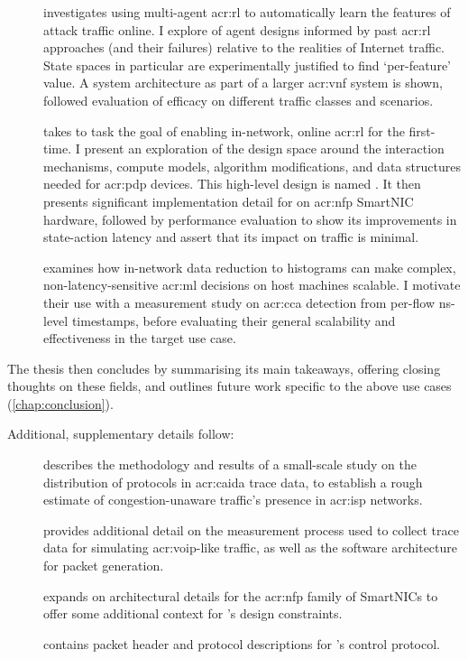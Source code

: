 \begin{description}
	\item[] investigates using multi-agent \gls{acr:rl} to automatically learn the features of attack traffic online. I explore of agent designs informed by past \gls{acr:rl} approaches (and their failures) relative to the realities of Internet traffic. State spaces in particular are experimentally justified to find `per-feature' value. A system architecture as part of a larger \gls{acr:vnf} system is shown, followed evaluation of efficacy on different traffic classes and scenarios.
	\item[] takes to task the goal of enabling in-network, online \gls{acr:rl} for the first-time. I present an exploration of the design space around the interaction mechanisms, compute models, algorithm modifications, and data structures needed for \gls{acr:pdp} devices. This high-level design is named \approachshort{}. It then presents significant implementation detail for \approachshort{} on \gls{acr:nfp} SmartNIC hardware, followed by performance evaluation to show its improvements in state-action latency and assert that its impact on traffic is minimal.
	\item[] examines how in-network data reduction to histograms can make complex, non-latency-sensitive \gls{acr:ml} decisions on host machines scalable. I motivate their use with a measurement study on \gls{acr:cca} detection from per-flow \unit{\nano\second}-level timestamps, before evaluating their general scalability and effectiveness in the target use case.
\end{description}
The thesis then concludes by summarising its main takeaways, offering closing thoughts on these fields, and outlines future work specific to the above use cases (\cref{chap:conclusion}).

Additional, supplementary details follow:
\begin{description}
	\item[] describes the methodology and results of a small-scale study on the distribution of protocols in \gls{acr:caida} trace data, to establish a rough estimate of congestion-unaware traffic's presence in \gls{acr:isp} networks.
	\item[] provides additional detail on the measurement process used to collect trace data for simulating \gls{acr:voip}-like traffic, as well as the software architecture for packet generation.
	\item[] expands on architectural details for the \gls{acr:nfp} family of SmartNICs to offer some additional context for \approachshort{}'s design constraints.
	\item[] contains packet header and protocol descriptions for \approachshort{}'s control protocol.
\end{description}